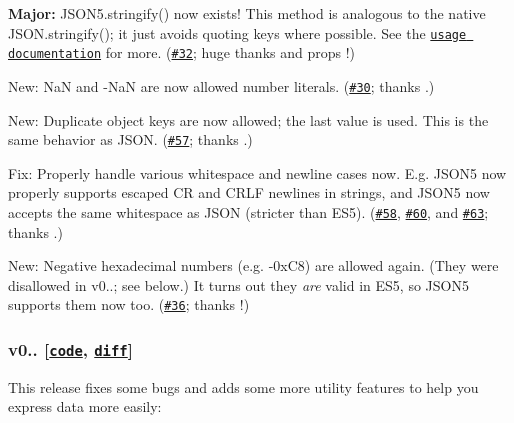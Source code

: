 \begin{DoxyItemize}
\item {\bfseries Major\+:} {\ttfamily J\+S\+O\+N5.\+stringify()} now exists! This method is analogous to the native {\ttfamily J\+S\+O\+N.\+stringify()}; it just avoids quoting keys where possible. See the \href{./README.md#usage}{\tt usage documentation} for more. (\href{https://github.com/aseemk/json5/issues/32}{\tt \#32}; huge thanks and props \href{https://github.com/aeisenberg}{\tt }!)
\item New\+: {\ttfamily NaN} and {\ttfamily -\/\+NaN} are now allowed number literals. (\href{https://github.com/aseemk/json5/issues/30}{\tt \#30}; thanks \href{https://github.com/rowanhill}{\tt }.)
\item New\+: Duplicate object keys are now allowed; the last value is used. This is the same behavior as J\+S\+ON. (\href{https://github.com/aseemk/json5/issues/57}{\tt \#57}; thanks \href{https://github.com/jordanbtucker}{\tt }.)
\item Fix\+: Properly handle various whitespace and newline cases now. E.\+g. J\+S\+O\+N5 now properly supports escaped CR and C\+R\+LF newlines in strings, and J\+S\+O\+N5 now accepts the same whitespace as J\+S\+ON (stricter than E\+S5). (\href{https://github.com/aseemk/json5/pull/58}{\tt \#58}, \href{https://github.com/aseemk/json5/pull/60}{\tt \#60}, and \href{https://github.com/aseemk/json5/pull/63}{\tt \#63}; thanks \href{https://github.com/jordanbtucker}{\tt }.)
\item New\+: Negative hexadecimal numbers (e.\+g. {\ttfamily -\/0x\+C8}) are allowed again. (They were disallowed in v0..; see below.) It turns out they {\itshape are} valid in E\+S5, so J\+S\+O\+N5 supports them now too. (\href{https://github.com/aseemk/json5/issues/36}{\tt \#36}; thanks \href{https://github.com/jordanbtucker}{\tt }!)
\end{DoxyItemize}

\subsubsection*{v0.. \mbox{[}\href{https://github.com/aseemk/json5/tree/v0.2.0}{\tt code}, \href{https://github.com/aseemk/json5/compare/v0.1.0...v0.2.0}{\tt diff}\mbox{]}}

This release fixes some bugs and adds some more utility features to help you express data more easily\+:


